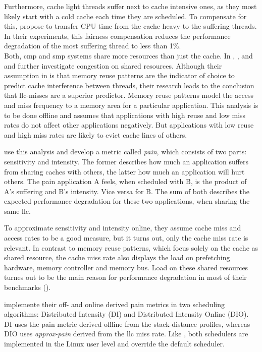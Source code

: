 Furthermore, cache light threads suffer next to cache intensive ones, as they
most likely start with a cold cache each time they are scheduled.
To compensate for this, \citeauthor{knauerhase_using_2008} propose to transfer
CPU time from the cache heavy to the suffering threads.
In their experiments, this fairness compensation reduces the performance
degradation of the most suffering thread to less than 1\%.
\\

Both, \gls{cmp} and \gls{smp} systems share more resources than just the cache.
In \cite{fedorova_managing_2010}, \cite{zhuravlev_addressing_2010}, and
\cite{zhuravlev_survey_2012} \citeauthor{fedorova_managing_2010} and
\citeauthor{zhuravlev_addressing_2010} further investigate congestion on shared
resources.
Although their assumption in \cite{fedorova_managing_2010} is that memory
reuse patterns are the indicator of
choice to predict cache interference between threads, their research leads to
the conclusion that \gls{llc}-misses are a superior predictor.
Memory reuse patterns model the access and miss frequency to a memory area for
a particular application.
This analysis is to be done offline and assumes that applications with high
reuse and low miss rates do not affect other applications negatively.
But applications with low reuse and high miss rates are likely to evict cache
lines of others.

\citeauthor{zhuravlev_addressing_2010} use this analysis and develop a
metric called \emph{pain}, which consists of two parts: sensitivity and intensity.
The former describes how much an application suffers from sharing caches with
others, the latter how much an application will hurt others.
The pain application A feels, when scheduled with B, is the product of A's
suffering and B's intensity.
Vice versa for B.
The sum of both describes the expected performance degradation for these two
applications, when sharing the same \gls{llc}.

To approximate sensitivity and intensity online, they assume cache miss and
access rates to be a good measure, but it turns out, only the cache miss
rate is relevant.
In contrast to memory reuse patterns, which focus solely on the cache as shared
resource, the cache miss rate also displays the load on prefetching hardware,
memory controller and memory bus.
Load on these shared resources turnes out to be the main reason for performance
degradation in most of their benchmarks (\cite{zhuravlev_addressing_2010}).

\citeauthor{zhuravlev_addressing_2010} implemente their off- and online
derived pain metrics in two scheduling algorithms: Distributed Intensity (DI)
and Distributed Intensity Online (DIO).
DI uses the pain metric derived offline from the stack-distance profiles,
whereas DIO uses \emph{approx-pain} derived from the \gls{llc} miss rate.
Like \cite{banikazemi_pam_2008}, both schedulers are implemented in the
Linux user level and override the default scheduler.

